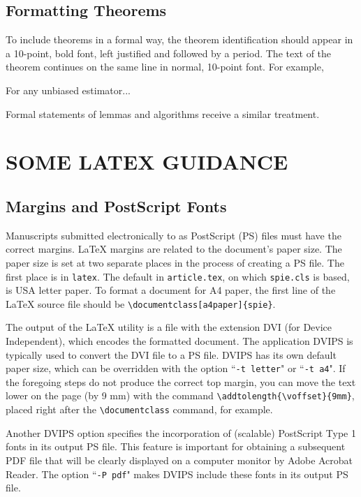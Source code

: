 \documentclass[]{spie}  %
\begin{document}
\subsection{Formatting Theorems} 

To include theorems in a formal way, the theorem identification should appear in a 10-point, bold font, left justified and followed by a period.  The text of the theorem continues on the same line in normal, 10-point font.  For example, 

 For any unbiased estimator...

Formal statements of lemmas and algorithms receive a similar treatment.

\section{SOME LATEX GUIDANCE} \label{sec:latex}

\subsection{Margins and PostScript Fonts}
 
Manuscripts submitted electronically to as PostScript (PS) files must have the correct margins. LaTeX margins are related to the document's paper size. The paper size is set at two separate places in the process of creating a PS file. The first place is in {\tt latex}. The default in {\tt article.tex}, on which {\tt spie.cls} is based, is USA letter paper. To format a document for A4 paper, the first line of the LaTeX source file should be \verb|\documentclass[a4paper]{spie}|.   

The output of the LaTeX utility is a file with the extension DVI (for Device Independent), which encodes the formatted document.  The application DVIPS is typically used to convert the DVI file to a PS file.  DVIPS has its own default paper size, which can be overridden with the option ``{\tt -t letter}" or ``{\tt -t a4}".  
If the foregoing steps do not produce the correct top margin, you can move the text lower on the page (by 9 mm) with the command \verb|\addtolength{\voffset}{9mm}|, placed right after the \verb|\documentclass| command, for example.

Another DVIPS option specifies the incorporation of (scalable) PostScript Type 1 fonts in its output PS file. This feature is important for obtaining a subsequent PDF file that will be clearly displayed on a computer monitor by Adobe Acrobat Reader.  The option ``{\tt -P pdf}" makes DVIPS include these fonts in its output PS file.
\end{document}
